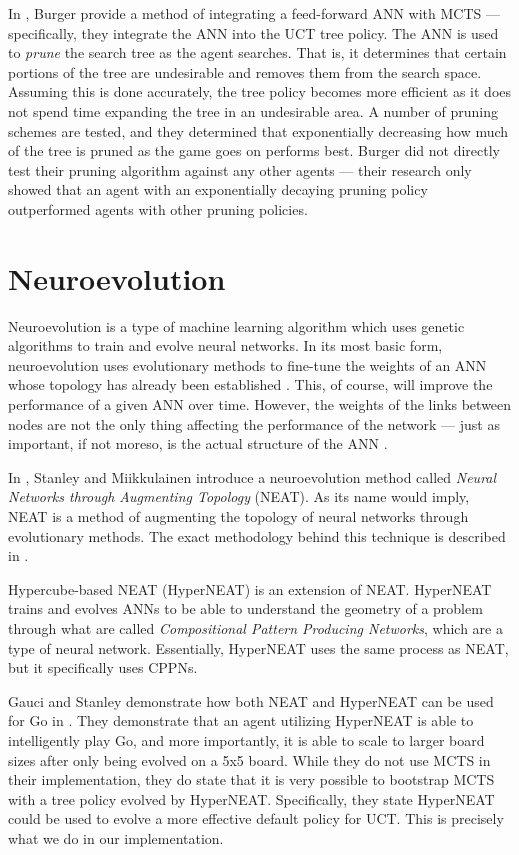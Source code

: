 In \cite{annpruning}, Burger \etal provide a method of integrating a feed-forward ANN with MCTS --- specifically, they integrate the ANN into the UCT tree policy.  The ANN is used to \textit{prune} the search tree as the agent searches.  That is, it determines that certain portions of the tree are undesirable and removes them from the search space.  Assuming this is done accurately, the tree policy becomes more efficient as it does not spend time expanding the tree in an undesirable area.  A number of pruning schemes are tested, and they determined that exponentially decreasing how much of the tree is pruned as the game goes on performs best.  Burger \etal did not directly test their pruning algorithm against any other agents --- their research only showed that an agent with an exponentially decaying pruning policy outperformed agents with other pruning policies.  

\section{Neuroevolution}
Neuroevolution is a type of machine learning algorithm which uses genetic algorithms to train and evolve neural networks.  In its most basic form, neuroevolution uses evolutionary methods to fine-tune the weights of an ANN whose topology has already been established \cite{aimodern}.  This, of course, will improve the performance of a given ANN over time.  However, the weights of the links between nodes are not the only thing affecting the performance of the network --- just as important, if not moreso, is the actual structure of the ANN \cite{NEAT}.

In \cite{NEAT}, Stanley and Miikkulainen introduce a neuroevolution method called \textit{Neural Networks through Augmenting Topology} (NEAT).  As its name would imply, NEAT is a method of augmenting the topology of neural networks through evolutionary methods.  The exact methodology behind this technique is described in \cite{NEAT}.

Hypercube-based NEAT (HyperNEAT) is an extension of NEAT.  HyperNEAT trains and evolves ANNs to be able to understand the geometry of a problem through what are called \textit{Compositional Pattern Producing Networks}, which are a type of neural network.  Essentially, HyperNEAT uses the same process as NEAT, but it specifically uses CPPNs.  \cite{HyperNEAT}

Gauci and Stanley demonstrate how both NEAT and HyperNEAT can be used for Go in \cite{hyperneatgo}.  They demonstrate that an agent utilizing HyperNEAT is able to intelligently play Go, and more importantly, it is able to scale to larger board sizes after only being evolved on a 5x5 board.  While they do not use MCTS in their implementation, they do state that it is very possible to bootstrap MCTS with a tree policy evolved by HyperNEAT.  Specifically, they state HyperNEAT could be used to evolve a more effective default policy for UCT.  This is precisely what we do in our implementation.

